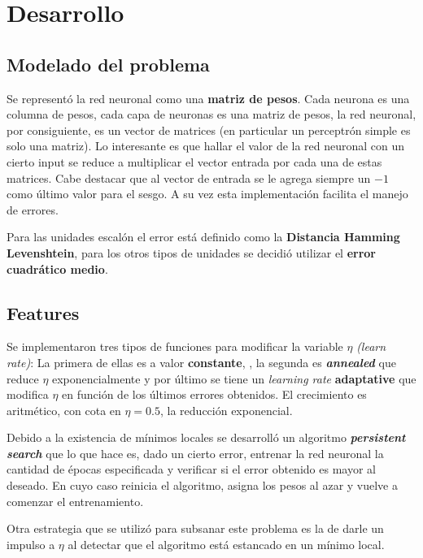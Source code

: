 \documentclass[%
    final,
    reprint,
    notitlepage,
    narroweqnarray,
    inline,
    twoside,
    invited
    ]{ieee}
\begin{document}

\section{Desarrollo}

\subsection{Modelado del problema}

\par Se representó la red neuronal como una \textbf{matriz de pesos}. Cada neurona es una columna de pesos, cada capa de 
neuronas es una matriz de pesos, la red neuronal, por consiguiente, es un vector de matrices (en particular un 
perceptrón simple es solo una matriz). Lo interesante es que hallar 
el valor de la red neuronal con un cierto input se reduce a multiplicar el vector entrada por cada una de estas matrices. Cabe destacar 
que al vector de entrada se le agrega siempre un $-1$ como último valor para el sesgo.
A su vez esta implementación facilita el manejo de errores.\\

\par Para las unidades escalón el error está definido como la \textbf{Distancia Hamming Levenshtein}, para los otros tipos de unidades se decidió utilizar el \textbf{error cuadrático medio}.

\subsection{Features}

\par Se implementaron tres tipos de funciones para modificar la variable $\eta$ \textit{(learn rate)}: 
La primera de ellas es a valor \textbf{constante}, , la segunda es \textbf{\textit{annealed}} que reduce $\eta$ exponencialmente y por último se 
tiene un \textit{learning rate} \textbf{adaptative} que modifica $\eta$ en función de los últimos errores obtenidos. El crecimiento es aritmético, con cota 
en $\eta =0.5$, la reducción exponencial.

\par Debido a la existencia de mínimos locales se desarrolló un algoritmo  \textbf{\textit{persistent search}} que lo que hace es, dado un cierto error, entrenar la red neuronal la cantidad de épocas especificada y verificar si el error obtenido es mayor al deseado. En cuyo caso reinicia el algoritmo, asigna los pesos al azar y vuelve a comenzar el entrenamiento.
\par Otra estrategia que se utilizó para subsanar este problema es la de darle un impulso a $\eta$ al detectar que el algoritmo está estancado en un mínimo local.
\end{document}
